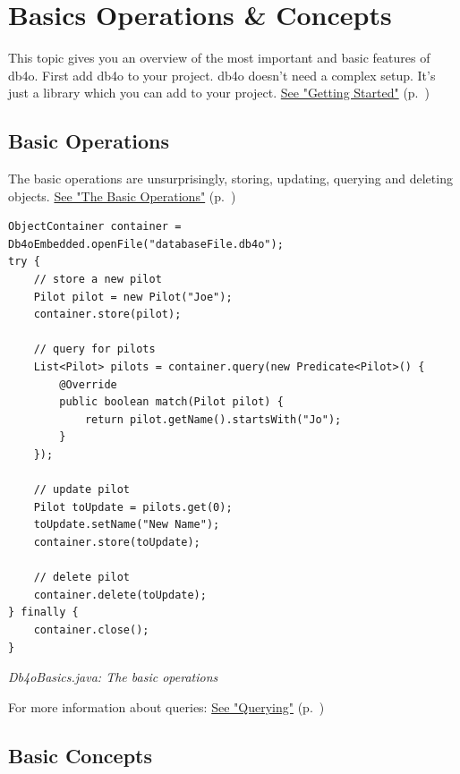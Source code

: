 
\chapter{Basics Operations \& Concepts}
\label{ref:basics}

This topic gives you an overview of the most important and basic features of db4o. First add db4o to your project. db4o doesn't need a complex setup. It's just a library which you can add to your project. \hyperref[ref:basics-getting-started]{See "Getting Started"} (p.~\pageref{ref:basics-getting-started})

\section*{Basic Operations}

The basic operations are unsurprisingly, storing, updating, querying and deleting objects. \hyperref[ref:basics-object-container]{See "The Basic Operations"} (p.~\pageref{ref:basics-object-container})

\begin{lstlisting}
ObjectContainer container = Db4oEmbedded.openFile("databaseFile.db4o");
try {
    // store a new pilot
    Pilot pilot = new Pilot("Joe");
    container.store(pilot);

    // query for pilots
    List<Pilot> pilots = container.query(new Predicate<Pilot>() {
        @Override
        public boolean match(Pilot pilot) {
            return pilot.getName().startsWith("Jo");
        }
    });

    // update pilot
    Pilot toUpdate = pilots.get(0);
    toUpdate.setName("New Name");
    container.store(toUpdate);

    // delete pilot
    container.delete(toUpdate);
} finally {
    container.close();
}
\end{lstlisting}

{\small\itshape Db4oBasics.java: The basic operations\par}
\medskip

For more information about queries: \hyperref[ref:basics-querying]{See "Querying"} (p.~\pageref{ref:basics-querying})

\section*{Basic Concepts}

